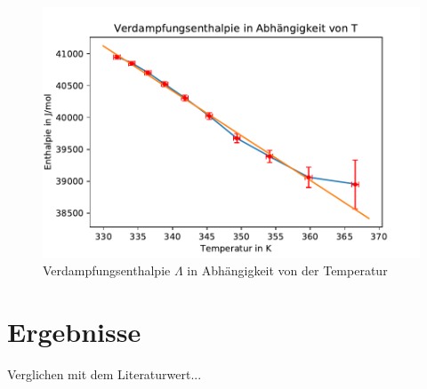 \documentclass[]{article}
\begin{document}
	\begin{figure}
		\begin{center}
			\includegraphics[scale=0.9]{Images/Dampfdruck_L.pdf}
			\caption{Verdampfungsenthalpie $\Lambda$ in Abhängigkeit von der Temperatur}
			\label{DD_L(T)}
		\end{center}
	\end{figure}
	
	\section{Ergebnisse}
	{\color{red} Verglichen mit dem Literaturwert...}
	
\end{document}
